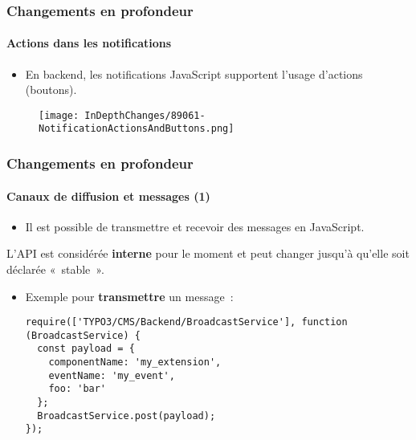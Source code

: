 
\begin{frame}[fragile]
	\frametitle{Changements en profondeur}
	\framesubtitle{Actions dans les notifications}

	\begin{itemize}
		\item En backend, les notifications JavaScript supportent l'usage d'actions (boutons).
	\end{itemize}

	\begin{figure}
		\texttt{[image: InDepthChanges/89061-NotificationActionsAndButtons.png]}
	\end{figure}

\end{frame}


\begin{frame}[fragile]
	\frametitle{Changements en profondeur}
	\framesubtitle{Canaux de diffusion et messages (1)}

	\lstset{basicstyle=\tiny\ttfamily}

	\begin{itemize}
		\item Il est possible de transmettre et recevoir des messages en JavaScript.
	\end{itemize}

	\vspace{-0.2cm}
	\begingroup
		\color{red}
			\begin{center}
				L'API est considérée \textbf{interne} pour le moment\newline
				et peut changer jusqu'à qu'elle soit déclarée «~stable~».
			\end{center}
	\endgroup

	\begin{itemize}
		\item Exemple pour \textbf{transmettre} un message~:
\begin{lstlisting}
require(['TYPO3/CMS/Backend/BroadcastService'], function (BroadcastService) {
  const payload = {
    componentName: 'my_extension',
    eventName: 'my_event',
    foo: 'bar'
  };
  BroadcastService.post(payload);
});
\end{lstlisting}

	\end{itemize}

\end{frame}

